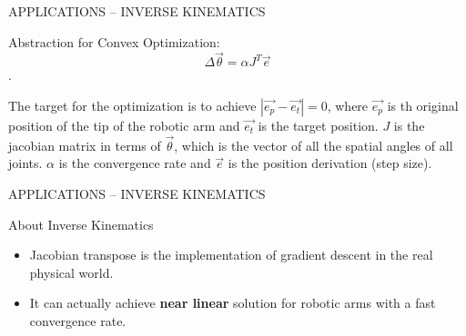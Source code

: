 \begin{frame}{ \LARGE APPLICATIONS -- INVERSE KINEMATICS}
  \begin{redblock}{Abstraction for Convex Optimization:}
$$\Delta \vec{\theta} = \alpha J^T \vec{e}$$.

The target for the optimization is to achieve $|\vec{e_p}-\vec{e_t}| =
0$, where $\vec{e_p}$ is th original position of the tip of the
robotic arm and $\vec{e_t}$ is the target position.
$J$ is the jacobian matrix in terms of $\vec{\theta}$, which is the
vector of all the spatial angles of all  joints. $\alpha$ is the
convergence rate and $\vec{e}$ is the position derivation (step size).

  \end{redblock}

\end{frame}

\begin{frame}{ \LARGE APPLICATIONS -- INVERSE KINEMATICS}
  \begin{greyblock}{About Inverse Kinematics}
    \begin{itemize}
    \item Jacobian transpose is the implementation of gradient descent
      in the real physical world.
    \item It can actually achieve {\bf near linear} solution for
      robotic arms with a fast convergence rate.
    \end{itemize}
  \end{greyblock}

\end{frame}
